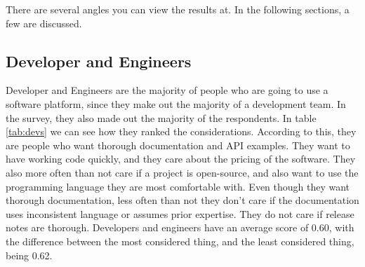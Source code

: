 \documentclass{cslthse-msc}
\begin{document}
    There are several angles you can view the results at. In the following sections, a few are discussed.
    \subsection{Developer and Engineers}
    Developer and Engineers are the majority of people who are going to use a software platform, since they make out the majority of a development team. In the survey, they also made out the majority of the respondents. In table \ref{tab:devs} we can see how they ranked the considerations. According to this, they are people who want thorough documentation and API examples. They want to have working code quickly, and they care about the pricing of the software. They also more often than not care if a project is open-source, and also want to use the programming language they are most comfortable with. Even though they want thorough documentation, less often than not they don't care if the documentation uses inconsistent language or assumes prior expertise. They do not care if release notes are thorough. Developers and engineers have an average score of 0.60, with the difference between the most considered thing, and the least considered thing, being 0.62.
\end{document}
